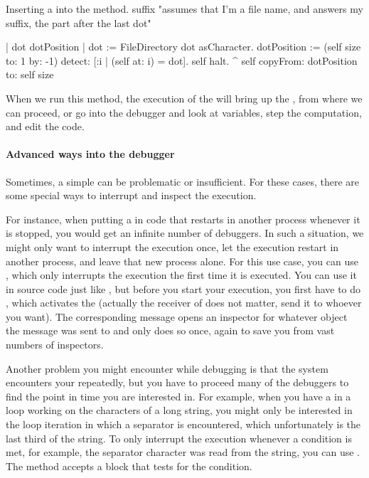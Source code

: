 \documentclass[a4paper,10pt,twoside]{book}
\begin{document}
\needspace{11ex}
\begin{method}[suffix]{Inserting a  into the  method.}
suffix
	"assumes that I'm a file name, and answers my suffix, the part after the last dot"

	| dot dotPosition |
	dot := FileDirectory dot asCharacter.
	dotPosition := (self size to: 1 by: -1) detect: [:i | (self at: i) = dot].
	self halt.
	^ self copyFrom: dotPosition to: self size
\end{method}

When we run this method, the execution of the  will bring up the , from where we can proceed, or go into the debugger and look at variables, step the computation, and edit the code.

\paragraph{Advanced ways into the debugger}

Sometimes, a simple  can be problematic or insufficient. 
For these cases, there are some special ways to interrupt and inspect the execution.

For instance, when putting a  in code that restarts in another process whenever it is stopped, you would get an infinite number of debuggers.
In such a situation, we might only want to interrupt the execution once, let the execution restart in another process, and leave that new process alone.
For this use case, you can use , which only interrupts the execution the first time it is executed. 
You can use it in source code just like , but before you start your execution, you first have to do , which activates the  (actually the receiver of  does not matter, send it to whoever you want).
The corresponding message  opens an inspector for whatever object the message was sent to and only does so once, again to save you from vast numbers of inspectors.

Another problem you might encounter while debugging is that the system encounters your  repeatedly, but you have to proceed many of the debuggers to find the point in time you are interested in.
For example, when you have a  in a loop working on the characters of a long string, you might only be interested in the loop iteration in which a separator is encountered, which unfortunately is the last third of the string.
To only interrupt the execution whenever a condition is met, for example, the separator character was read from the string, you can use .
The method accepts a block that tests for the condition.
\end{document}
